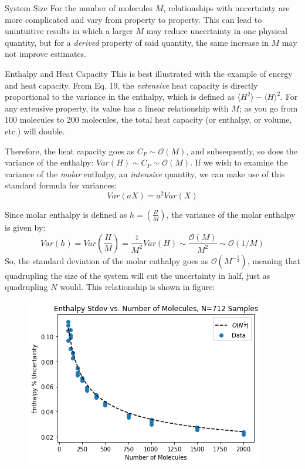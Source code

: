 \documentclass[aps,pre,twocolumn,nofootinbib,superscriptaddress,linenumbers,10pt, draft,tightenlines]{revtex4-1}
\begin{document}
\begin{subsection}{System Size}
For the number of molecules $M$, relationships with uncertainty are more complicated and vary from property to property.   This can lead to unintuitive results in which a larger $M$ may reduce uncertainty in one physical quantity, but for a \emph{derived} property of said quantity, the same increase in $M$ may not improve estimates.
\begin{subsubsection}{Enthalpy and Heat Capacity}
This is best illustrated with the example of energy and heat capacity.  From Eq. 19, %
the \emph{extensive} heat capacity is directly proportional to the variance in the enthalpy, which is defined as $\langle H^2 \rangle - \langle H \rangle^2$.  For any extensive property, its value has a linear relationship with $M$; as you go from 100 molecules to 200 molecules, the total heat capacity (or enthalpy, or volume, etc.) will double.

Therefore, the heat capacity goes as $C_P \sim \mathcal{O}(M)$, and subsequently, so does the variance of the enthalpy: $ Var(H) \sim C_P \sim \mathcal{O}(M) $.  If we wish to examine the variance of the \emph{molar} enthalpy, an \emph{intensive} quantity, we can make use of this standard formula for variances:
\begin{equation}
Var(aX)=a^2Var(X)
\end{equation}

Since molar enthalpy is defined as $h=\left(\frac{H}{M}\right)$, the variance of the molar enthalpy is given by:
\begin{equation}
Var(h) = Var\left(\frac{H}{M}\right) = \frac{1}{M^2} Var(H) \sim \frac{\mathcal{O}(M)}{M^2} \sim \mathcal{O} (1/M)
\end{equation}
So, the standard deviation of the molar enthalpy goes as $\mathcal{O} (M^{-\frac{1}{2}})$, meaning that quadrupling the size of the system will cut the uncertainty in half, just as quadrupling $N$ would.  This relationship is shown in figure:

\begin{figure}[H]
\includegraphics[width=\textwidth]{../figures/enthalpy_stdev_vs_M.png}
\end{figure}


\end{subsubsection}
\end{subsection}
\end{document}

